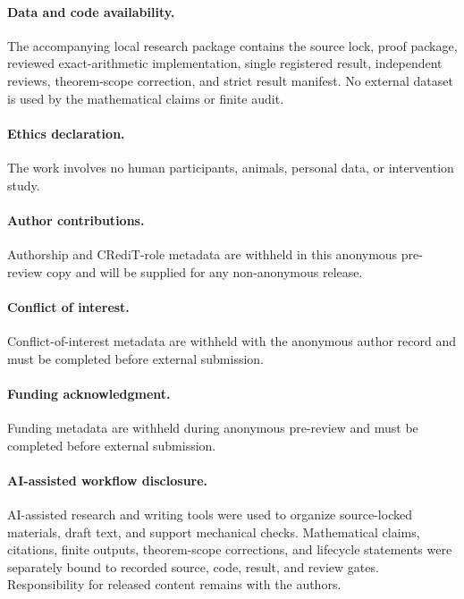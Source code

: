 \documentclass[11pt]{article}
\theoremstyle{definition}
\theoremstyle{remark}
\begin{document}
\paragraph{Data and code availability.}
The accompanying local research package contains the source lock, proof
package, reviewed exact-arithmetic implementation, single registered result,
independent reviews, theorem-scope correction, and strict result manifest.
No external dataset is used by the mathematical claims or finite audit.

\paragraph{Ethics declaration.}
The work involves no human participants, animals, personal data, or
intervention study.

\paragraph{Author contributions.}
Authorship and CRediT-role metadata are withheld in this anonymous pre-review
copy and will be supplied for any non-anonymous release.

\paragraph{Conflict of interest.}
Conflict-of-interest metadata are withheld with the anonymous author record
and must be completed before external submission.

\paragraph{Funding acknowledgment.}
Funding metadata are withheld during anonymous pre-review and must be
completed before external submission.

\paragraph{AI-assisted workflow disclosure.}
AI-assisted research and writing tools were used to organize source-locked
materials, draft text, and support mechanical checks.  Mathematical claims,
citations, finite outputs, theorem-scope corrections, and lifecycle
statements were separately bound to recorded source, code, result, and review
gates.  Responsibility for released content remains with the authors.



\end{document}
